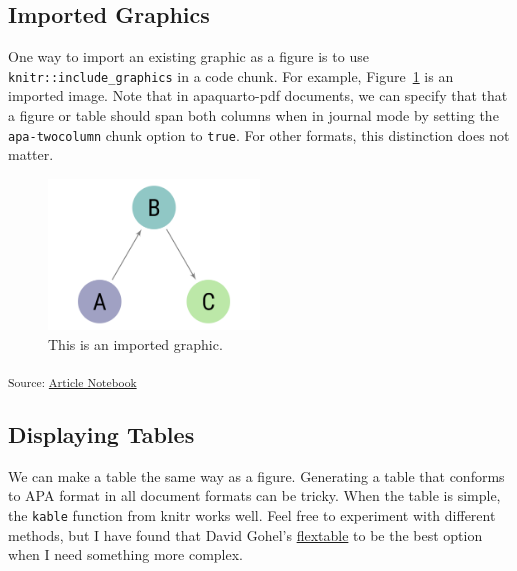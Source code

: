 \documentclass[
  man,
  floatsintext,
  longtable,
  nolmodern,
  notxfonts,
  notimes,
  mask,
  colorlinks=true,linkcolor=blue,citecolor=blue,urlcolor=blue]{apa7}
\begin{document}
\subsection{Imported Graphics}\label{imported-graphics}

One way to import an existing graphic as a figure is to use
\texttt{knitr::include\_graphics} in a code chunk. For example,
Figure~\ref{fig-importedgraphic} is an imported image. Note that in
apaquarto-pdf documents, we can specify that that a figure or table
should span both columns when in journal mode by setting the
\texttt{apa-twocolumn} chunk option to \texttt{true}. For other formats,
this distinction does not matter.

\label{cell-fig-importedgraphic}
\begin{figure}[h]

{\caption{{This is an imported graphic.}{\label{fig-importedgraphic}}}}

\includegraphics[width=0.5\textwidth,height=\textheight]{4-Outputs/sampleimage.png}

\end{figure}

\textsubscript{Source:
\href{https://mavrxlab.github.io/project-template/index.qmd.html}{Article
Notebook}}

\subsection{Displaying Tables}\label{displaying-tables}

We can make a table the same way as a figure. Generating a table that
conforms to APA format in all document formats can be tricky. When the
table is simple, the \texttt{kable} function from knitr works well. Feel
free to experiment with different methods, but I have found that David
Gohel's \href{https://davidgohel.github.io/flextable/}{flextable} to be
the best option when I need something more complex.
\end{document}
